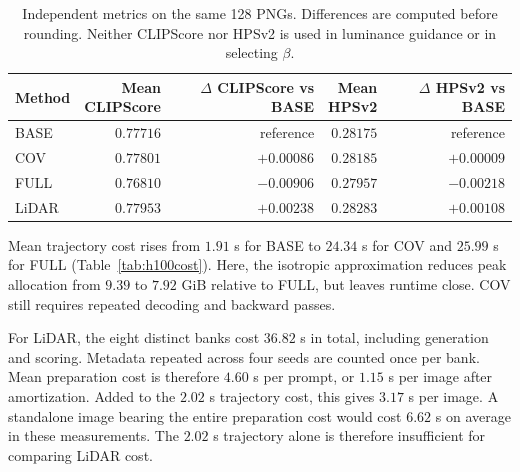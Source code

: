 \documentclass[11pt,a4paper]{article}
\begin{document}
\begin{table}[!htb]
\centering\small
\begin{tabular}{lrrrr}
\toprule
Method & \shortstack{Mean\\CLIPScore} & \shortstack{$\Delta$ CLIPScore\\vs BASE} & \shortstack{Mean\\HPSv2} & \shortstack{$\Delta$ HPSv2\\vs BASE}\\
\midrule
BASE & $0.77716$ & reference & $0.28175$ & reference\\
COV & $0.77801$ & $+0.00086$ & $0.28185$ & $+0.00009$\\
FULL & $0.76810$ & $-0.00906$ & $0.27957$ & $-0.00218$\\
LiDAR & $0.77953$ & $+0.00238$ & $0.28283$ & $+0.00108$\\
\bottomrule
\end{tabular}
\caption{Independent metrics on the same 128 PNGs. Differences are computed before rounding. Neither CLIPScore nor HPSv2 is used in luminance guidance or in selecting $\beta$.}
\label{tab:h100quality}
\end{table}

Mean trajectory cost rises from $1.91$ s for BASE to $24.34$ s for COV and $25.99$ s for FULL (Table~\ref{tab:h100cost}). Here, the isotropic approximation reduces peak allocation from $9.39$ to $7.92$ GiB relative to FULL, but leaves runtime close. COV still requires repeated decoding and backward passes.

For LiDAR, the eight distinct banks cost $36.82$ s in total, including generation and scoring. Metadata repeated across four seeds are counted once per bank. Mean preparation cost is therefore $4.60$ s per prompt, or $1.15$ s per image after amortization. Added to the $2.02$ s trajectory cost, this gives $3.17$ s per image. A standalone image bearing the entire preparation cost would cost $6.62$ s on average in these measurements. The $2.02$ s trajectory alone is therefore insufficient for comparing LiDAR cost.
\end{document}
